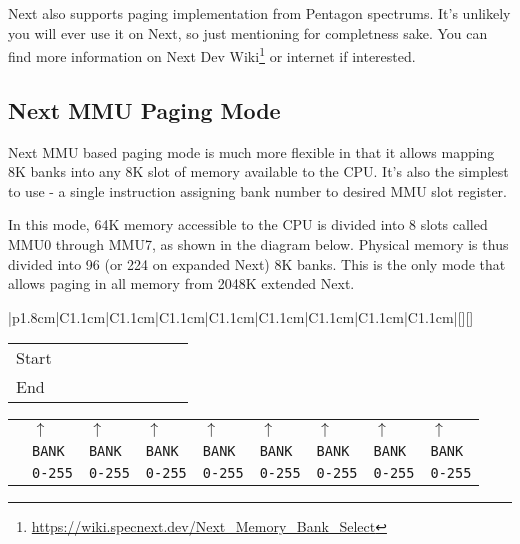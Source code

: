 Next also supports paging implementation from Pentagon spectrums. It's unlikely you will ever use it on Next, so just mentioning for completness sake. You can find more information on Next Dev Wiki\footnote{\url{https://wiki.specnext.dev/Next_Memory_Bank_Select}} or internet if interested.


\pagebreak
\subsection{Next MMU Paging Mode}

Next MMU based paging mode is much more flexible in that it allows mapping 8K banks into any 8K slot of memory available to the CPU. It's also the simplest to use - a single instruction assigning bank number to desired MMU slot register.

In this mode, 64K memory accessible to the CPU is divided into 8 slots called MMU0 through MMU7, as shown in the diagram below. Physical memory is thus divided into 96 (or 224 on expanded Next) 8K banks. This is the only mode that allows paging in all memory from 2048K extended Next.

\begin{ElegantTable}{|p{1.8cm}|C{1.1cm}|C{1.1cm}|C{1.1cm}|C{1.1cm}|C{1.1cm}|C{1.1cm}|C{1.1cm}|C{1.1cm}|}[][]
\end{ElegantTable}

\vspace*{-0.75em}

\begin{tabular}{|p{1.8cm}|C{1.1cm}|C{1.1cm}|C{1.1cm}|C{1.1cm}|C{1.1cm}|C{1.1cm}|C{1.1cm}|C{1.1cm}|}
	\hline
	Start	& 	& 	& 	& 	& 	& 	& 	&  \\
	End		& 	& 	& 	& 	& 	& 	& 	&  \\
	\hline
\end{tabular}

\vspace*{-0.7em}

\begin{tabular}{p{1.8cm}C{1.1cm}C{1.1cm}C{1.1cm}C{1.1cm}C{1.1cm}C{1.1cm}C{1.1cm}C{1.1cm}}
			& $\uparrow$		& $\uparrow$		& $\uparrow$		& $\uparrow$		& $\uparrow$		& $\uparrow$		& $\uparrow$		& $\uparrow$ \\
			& {\tt BANK}		& {\tt BANK}		& {\tt BANK}		& {\tt BANK}		& {\tt BANK}		& {\tt BANK}		& {\tt BANK}		& {\tt BANK} \\
			& {\tt 0-255}		& {\tt 0-255}		& {\tt 0-255}		& {\tt 0-255}		& {\tt 0-255}		& {\tt 0-255}		& {\tt 0-255}		& {\tt 0-255} \\
\end{tabular}

